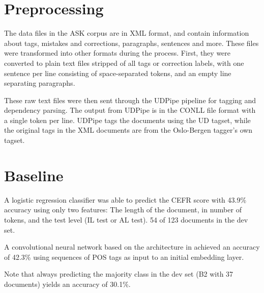 
\section{Preprocessing}

The data files in the ASK corpus are in XML format, and contain information
about tags, mistakes and corrections, paragraphs, sentences and more. These
files were transformed into other formats during the process. First, they
were converted to plain text files stripped of all tags or correction labels,
with one sentence per line consisting of space-separated tokens, and an empty
line separating paragraphs.

These raw text files were then sent through the UDPipe pipeline for tagging
and dependency parsing. The output from UDPipe is in the CONLL file format
with a single token per line. UDPipe tags the documents using the UD tagset,
while the original tags in the XML documents are from the Oslo-Bergen
tagger's own tagset.

\section{Baseline}

A logistic regression classifier was able to predict the CEFR score with
43.9\% accuracy using only two features: The length of the document, in
number of tokens, and the test level (IL test or AL test). 54 of 123
documents in the dev set.

A convolutional neural network based on the architecture in
\textcite{zhang2017sensitivity} achieved an accuracy of 42.3\% using
sequences of POS tags as input to an initial embedding layer.

Note that always predicting the majority class in the dev set (B2 with 37
documents) yields an accuracy of 30.1\%.
